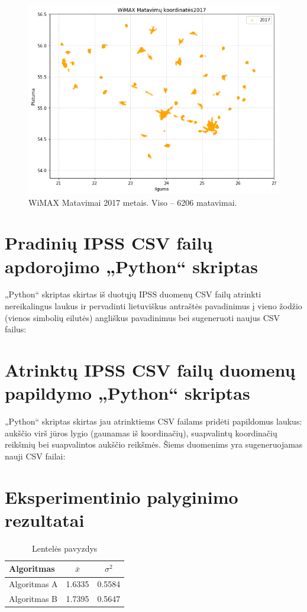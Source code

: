 \documentclass{VUMIFPSbakalaurinis}
\begin{document}
\begin{figure}[H]
	\centering
	\includegraphics[scale=0.33]{img/WiMAX-3}
	\caption{WiMAX Matavimai 2017 metais. Viso – 6206 matavimai.}
	\label{img:WiMAX-3}
\end{figure}

\section{Pradinių IPSS CSV failų apdorojimo „Python“ skriptas} \label{script1}
„Python“ skriptas skirtas iš duotųjų IPSS duomenų CSV failų atrinkti nereikalingus laukus ir pervadinti lietuviškus antraštės pavadinimus į vieno žodžio (vienos simbolių eilutės) angliškus pavadinimus bei sugeneruoti naujus CSV failus:


\section{Atrinktų IPSS CSV failų duomenų papildymo „Python“ skriptas} \label{script2}
„Python“ skriptas skirtas jau atrinktiems CSV failams pridėti papildomus laukus: aukščio virš jūros lygio (gaunamas iš koordinačių), suapvalintų koordinačių reikšmių bei suapvalintos aukščio reikšmės. Šiems duomenims yra sugeneruojamas nauji CSV failai:




\section{Eksperimentinio palyginimo rezultatai}
\begin{table}[H]\footnotesize
	\centering
	\caption{Lentelės pavyzdys}
	{\begin{tabular}{|l|c|c|} \hline
			Algoritmas & $\bar{x}$ & $\sigma^{2}$ \\
			\hline
			Algoritmas A  & 1.6335    & 0.5584       \\
			Algoritmas B  & 1.7395    & 0.5647       \\
			\hline
	\end{tabular}}
	\label{tab:table example}
\end{table}
\end{document}

